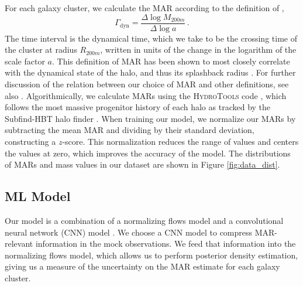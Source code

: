 \documentclass[twocolumn, linenumbers, 11pt]{aastex63}%
\begin{document}
For each galaxy cluster, we calculate the MAR according to the definition of \citet{Diemer_2020},
\begin{equation}\label{eqn:MAR_def}
    \Gamma_{\mathrm{dyn}} = \frac{\Delta \log M_{200m}}{\Delta \log a} \,.
\end{equation}
The time interval is the dynamical time, which we take to be the crossing time of the cluster at radius $R_{200m}$, written in units of the change in the logarithm of the scale factor $a$. This definition of MAR has been shown to most closely correlate with the dynamical state of the halo, and thus its splashback radius \citep{Shin_2023}. For further discussion of the relation between our choice of MAR and other definitions, see also \citet{Valles_Perez_2020}. Algorithmically, we calculate MARs using the \textsc{HydroTools} code \citep{diemer_17_sfh, diemer_18_hih2}, which follows the most massive progenitor history of each halo as tracked by the Subfind-HBT halo finder \citep{Springel_2021}. When training our model, we normalize our MARs by subtracting the mean MAR and dividing by their standard deviation, constructing a $z$-score. This normalization reduces the range of values and centers the values at zero, which improves the accuracy of the model. The distributions of MARs and mass values in our dataset are shown in Figure \ref{fig:data_dist}. 

\subsection{ML Model}\label{models}
Our model is a combination of a normalizing flows model \citep[see][for a review of normalizing flows]{Papamakarios_2019} and a convolutional neural network (CNN) model \citep[see][for a review of CNN and deep learning]{LeCun_2015}. We choose a CNN model to compress MAR-relevant information in the mock observations. We feed that information into the normalizing flows model, which allows us to perform posterior density estimation, giving us a measure of the uncertainty on the MAR estimate for each galaxy cluster. 
\end{document}
